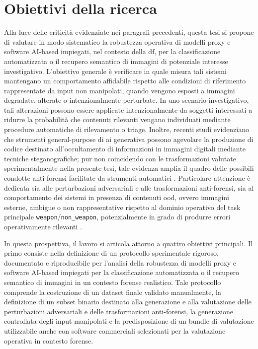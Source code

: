 \section{Obiettivi della ricerca}
Alla luce delle criticità evidenziate nei paragrafi precedenti, questa tesi si propone di valutare in modo sistematico la robustezza operativa di modelli proxy e software AI-based impiegati, nel contesto della \gls{df}, per la classificazione automatizzata o il recupero semantico di immagini di potenziale interesse investigativo. L'obiettivo generale è verificare in quale misura tali sistemi mantengano un comportamento affidabile rispetto alle condizioni di riferimento rappresentate da input non manipolati, quando vengono esposti a immagini degradate, alterate o intenzionalmente perturbate. In uno scenario investigativo, tali alterazioni possono essere applicate intenzionalmente da soggetti interessati a ridurre la probabilità che contenuti rilevanti vengano individuati mediante procedure automatiche di rilevamento o triage. Inoltre, recenti studi evidenziano che strumenti general-purpose di \gls{ai} generativa possono agevolare la produzione di codice destinato all'occultamento di informazioni in immagini digitali mediante tecniche steganografiche; pur non coincidendo con le trasformazioni valutate sperimentalmente nella presente tesi, tale evidenza amplia il quadro delle possibili condotte anti-forensi facilitate da strumenti automatici \cite{sanna2025cybercrime}. Particolare attenzione è dedicata sia alle perturbazioni adversariali e alle trasformazioni anti-forensi, sia al comportamento dei sistemi in presenza di contenuti \gls{ood}, ovvero immagini esterne, ambigue o non rappresentative rispetto al dominio operativo del task principale \texttt{weapon}/\texttt{non\_weapon}, potenzialmente in grado di produrre errori operativamente rilevanti \cite{hendrycks2017baseline,hendrycks2019benchmarking}.

In questa prospettiva, il lavoro si articola attorno a quattro obiettivi principali. Il primo consiste nella definizione di un protocollo sperimentale rigoroso, documentato e riproducibile per l'analisi della robustezza di modelli proxy e software AI-based impiegati per la classificazione automatizzata o il recupero semantico di immagini in un contesto forense realistico. Tale protocollo comprende la costruzione di un dataset finale validato manualmente, la definizione di un subset binario destinato alla generazione e alla valutazione delle perturbazioni adversariali e delle trasformazioni anti-forensi, la generazione controllata degli input manipolati e la predisposizione di un bundle di valutazione utilizzabile anche con software commerciali selezionati per la valutazione operativa in contesto forense.


